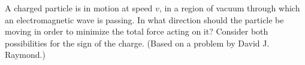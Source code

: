         A charged particle is in motion at speed $v$, in a region of vacuum through which 
        an electromagnetic wave is passing. In what direction should the particle be moving in order
        to minimize the total force acting on it? Consider both possibilities for the
        sign of the charge. (Based on a problem by David J. Raymond.)
